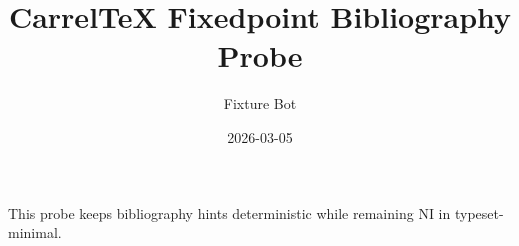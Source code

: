 \documentclass{article}
\title{CarrelTeX Fixedpoint Bibliography Probe}
\author{Fixture Bot}
\date{2026-03-05}
\begin{document}
\maketitle

This probe keeps bibliography hints deterministic while remaining NI in typeset-minimal.
\end{document}
